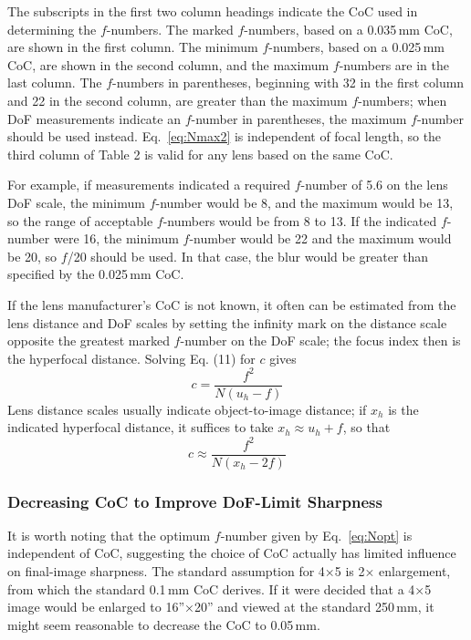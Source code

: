 \documentclass[11pt, oneside]{scrartcl}   	%
\begin{document}
The subscripts in the first two column headings indicate the CoC used in determining the $f$-numbers. The marked $f$-numbers, based on a 0.035\,mm CoC, are shown in the first column. The minimum $f$-numbers, based on a 0.025\,mm CoC, are shown in the second column, and the maximum $f$-numbers are in the last column. The $f$-numbers in parentheses, beginning with 32 in the first column and 22 in the second column, are greater than the maximum $f$-numbers; when DoF measurements indicate an $f$-number in parentheses, the maximum $f$-number should be used instead. Eq.~\ref{eq:Nmax2} is independent of focal length, so the third column of Table 2 is valid for any lens based on the same CoC.

For example, if measurements indicated a required $f$-number of 5.6 on the lens DoF scale, the minimum $f$-number would be 8, and the maximum would be 13, so the range of acceptable $f$-numbers would be from 8 to 13. If the indicated $f$-number were 16, the minimum $f$-number would be 22 and the maximum would be 20, so $f$/20 should be used. In that case, the blur would be greater than specified by the 0.025\,mm CoC.

If the lens manufacturer’s CoC is not known, it often can be estimated from the lens distance and DoF scales by setting the infinity mark on the distance scale opposite the greatest marked $f$-number on the DoF scale; the focus index then is the hyperfocal distance. Solving Eq. (11) for $c$ gives
\begin{equation}
c=\frac{f^2}{N(u_h-f)}
\end{equation}
Lens distance scales usually indicate object-to-image distance; if $x_h$ is the indicated hyperfocal distance, it suffices to take $x_h ≈ u_h + f$, so that
\begin{equation}
c\approx \frac{f^2}{N(x_h-2f)}
    \label{eq:capprox}
\end{equation}

\subsubsection{Decreasing CoC to Improve DoF-Limit Sharpness}

It is worth noting that the optimum $f$-number given by Eq.~\ref{eq:Nopt} is independent of CoC, suggesting the choice of CoC actually has limited influence on final-image sharpness. The standard assumption for 4×5 is 2× enlargement, from which the standard 0.1\,mm CoC derives. If it were decided that a 4×5 image would be enlarged to 16''×20'' and viewed at the standard 250\,mm, it might seem reasonable to decrease the CoC to 0.05\,mm.
\end{document}

